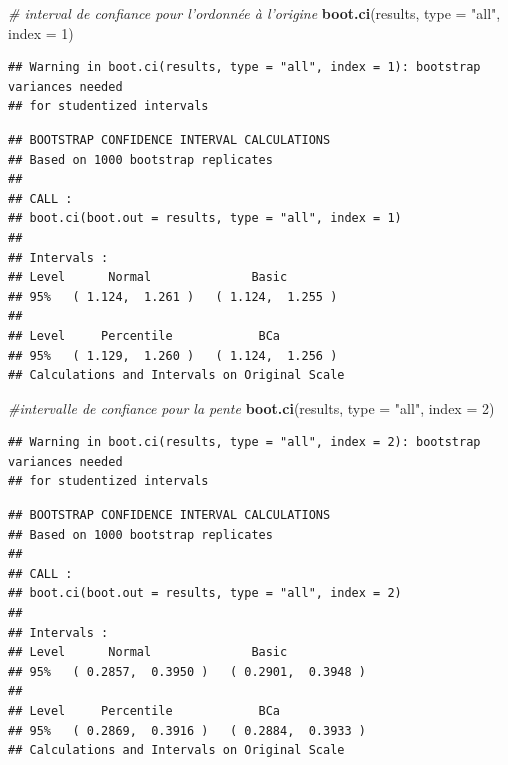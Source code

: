 \documentclass[12pt,]{book}
\newenvironment{Shaded}{\begin{snugshade}}{\end{snugshade}}
\newcommand{\CommentTok}[1]{\textcolor[rgb]{0.37,0.37,0.37}{\textit{#1}}}
\newcommand{\DataTypeTok}[1]{\textcolor[rgb]{0.27,0.27,0.27}{#1}}
\newcommand{\DecValTok}[1]{\textcolor[rgb]{0.06,0.06,0.06}{#1}}
\newcommand{\KeywordTok}[1]{\textcolor[rgb]{0.27,0.27,0.27}{\textbf{#1}}}
\newcommand{\NormalTok}[1]{#1}
\newcommand{\StringTok}[1]{\textcolor[rgb]{0.5,0.5,0.5}{#1}}
\begin{document}
\begin{Shaded}
\begin{Highlighting}[]
\CommentTok{# interval de confiance pour l'ordonnée à l'origine}
\KeywordTok{boot.ci}\NormalTok{(results, }\DataTypeTok{type =} \StringTok{"all"}\NormalTok{, }\DataTypeTok{index =} \DecValTok{1}\NormalTok{)}
\end{Highlighting}
\end{Shaded}

\begin{verbatim}
## Warning in boot.ci(results, type = "all", index = 1): bootstrap variances needed
## for studentized intervals
\end{verbatim}

\begin{verbatim}
## BOOTSTRAP CONFIDENCE INTERVAL CALCULATIONS
## Based on 1000 bootstrap replicates
## 
## CALL : 
## boot.ci(boot.out = results, type = "all", index = 1)
## 
## Intervals : 
## Level      Normal              Basic         
## 95%   ( 1.124,  1.261 )   ( 1.124,  1.255 )  
## 
## Level     Percentile            BCa          
## 95%   ( 1.129,  1.260 )   ( 1.124,  1.256 )  
## Calculations and Intervals on Original Scale
\end{verbatim}

\begin{Shaded}
\begin{Highlighting}[]
\CommentTok{#intervalle de confiance pour la pente}
\KeywordTok{boot.ci}\NormalTok{(results, }\DataTypeTok{type =} \StringTok{"all"}\NormalTok{, }\DataTypeTok{index =} \DecValTok{2}\NormalTok{)}
\end{Highlighting}
\end{Shaded}

\begin{verbatim}
## Warning in boot.ci(results, type = "all", index = 2): bootstrap variances needed
## for studentized intervals
\end{verbatim}

\begin{verbatim}
## BOOTSTRAP CONFIDENCE INTERVAL CALCULATIONS
## Based on 1000 bootstrap replicates
## 
## CALL : 
## boot.ci(boot.out = results, type = "all", index = 2)
## 
## Intervals : 
## Level      Normal              Basic         
## 95%   ( 0.2857,  0.3950 )   ( 0.2901,  0.3948 )  
## 
## Level     Percentile            BCa          
## 95%   ( 0.2869,  0.3916 )   ( 0.2884,  0.3933 )  
## Calculations and Intervals on Original Scale
\end{verbatim}
\end{document}
